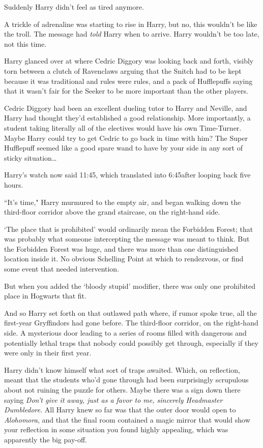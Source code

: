 Suddenly Harry didn't feel as tired anymore.

A trickle of adrenaline was starting to rise in Harry, but no, this wouldn't be like the troll. The message had \emph{told} Harry when to arrive. Harry wouldn't be too late, not this time.

Harry glanced over at where Cedric Diggory was looking back and forth, visibly torn between a clutch of Ravenclaws arguing that the Snitch had to be kept because it was traditional and rules were rules, and a pack of Hufflepuffs saying that it wasn't fair for the Seeker to be more important than the other players.

Cedric Diggory had been an excellent dueling tutor to Harry and Neville, and Harry had thought they'd established a good relationship. More importantly, a student taking literally all of the electives would have his own Time-Turner. Maybe Harry could try to get Cedric to go back in time with him? The Super Hufflepuff seemed like a good spare wand to have by your side in any sort of sticky situation{\ldots}


Harry's watch now said 11:45, which translated into 6:45\pm after looping back five hours.

``It's time," Harry murmured to the empty air, and began walking down the third-floor corridor above the grand staircase, on the right-hand side.

`The place that is prohibited' would ordinarily mean the Forbidden Forest; that was probably what someone intercepting the message was meant to think. But the Forbidden Forest was huge, and there was more than one distinguished location inside it. No obvious Schelling Point at which to rendezvous, or find some event that needed intervention.

But when you added the `bloody stupid' modifier, there was only one prohibited place in Hogwarts that fit.

And so Harry set forth on that outlawed path where, if rumor spoke true, all the first-year Gryffindors had gone before. The third-floor corridor, on the right-hand side. A mysterious door leading to a series of rooms filled with dangerous and potentially lethal traps that nobody could possibly get through, especially if they were only in their first year.

Harry didn't know himself what sort of traps awaited. Which, on reflection, meant that the students who'd gone through had been surprisingly scrupulous about not ruining the puzzle for others. Maybe there was a sign down there saying \emph{Don't give it away, just as a favor to me, sincerely Headmaster Dumbledore}. All Harry knew so far was that the outer door would open to \emph{Alohomora}, and that the final room contained a magic mirror that would show your reflection in some situation you found highly appealing, which was apparently the big pay-off.

